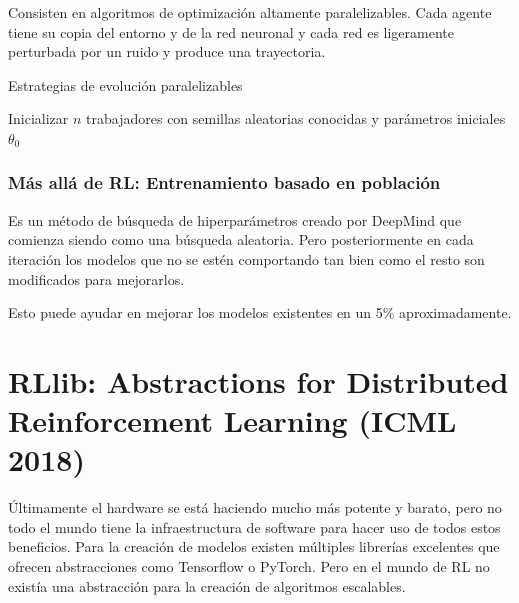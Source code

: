 Consisten en algoritmos de optimización altamente paralelizables. Cada agente tiene su copia
del entorno y de la red neuronal y cada red es ligeramente perturbada por un ruido y
produce una trayectoria.

\begin{algorithm}
    \caption{Estrategias de evolución paralelizables}
    Inicializar $n$ trabajadores con semillas aleatorias conocidas y parámetros iniciales
    $\theta_0$\\
\end{algorithm}

\subsubsection{Más allá de RL: Entrenamiento basado en población}%
\label{ssub:más_allá_de_rl_entrenamiento_basado_en_población}

Es un método de búsqueda de hiperparámetros creado por DeepMind que comienza siendo como una
búsqueda aleatoria. Pero posteriormente en cada iteración los modelos que no se estén
comportando tan bien como el resto son modificados para mejorarlos.

Esto puede ayudar en mejorar los modelos existentes en un 5\% aproximadamente.

\section{RLlib: Abstractions for Distributed Reinforcement Learning (ICML 2018)}%
\label{sec:rllib_abstractions_for_distributed_reinforcement_learning_icml_2018_}

 Últimamente el hardware se está haciendo mucho más potente y barato, pero no todo el mundo
 tiene la infraestructura de software para hacer uso de todos estos beneficios. Para la creación
 de modelos existen múltiples librerías excelentes que ofrecen abstracciones como Tensorflow
 o PyTorch. Pero en el mundo de RL no existía una abstracción para la creación de algoritmos
 escalables.

